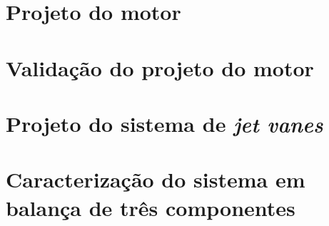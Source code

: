 
\section{Projeto do motor}

\section{Validação do projeto do motor}

\section{Projeto do sistema de \textit{jet vanes}}

\section{Caracterização do sistema em balança de três componentes}